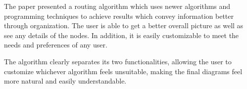 The paper presented a routing algorithm which uses newer algorithms and
programming techniques to achieve results which convey information better
through organization. The user is able to get a better overall picture as 
well as see any details of the nodes. In addition, it is easily customizable to meet the needs and 
preferences of any user.

The algorithm clearly separates its two functionalities, allowing the 
user to customize whichever algorithm feels unsuitable, making the 
final diagrams feel more natural and easily understandable.
